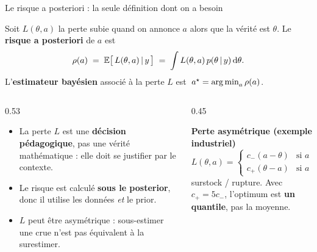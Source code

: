 \begin{frame}{Le risque a posteriori : la seule définition dont on a besoin}
\small
\vspace{-1mm}
\begin{kbox}
Soit $L(\theta, a)$ la perte subie quand on annonce $a$ alors que la vérité est $\theta$.
Le \textbf{risque a posteriori} de $a$ est
\[
\rho(a) \;=\; \mathbb{E}\big[\,L(\theta, a) \,\vert\, y \,\big]
\;=\; \int L(\theta, a)\, p(\theta \,\vert\, y)\,\mathrm{d}\theta .
\]
L'\textbf{estimateur bayésien} associé à la perte $L$ est
$\;a^\star = \operatorname*{arg\,min}_{a} \rho(a)$.
\end{kbox}
\vspace{1mm}
\begin{columns}[t]
\begin{column}{0.53\textwidth}
\begin{ebox}
\begin{itemize}
  \item La perte $L$ est une \textbf{décision pédagogique}, pas une vérité
        mathématique : elle doit se justifier par le contexte.
  \item Le risque est calculé \textbf{sous le posterior}, donc il utilise les
        données \emph{et} le prior.
  \item $L$ peut être asymétrique : sous-estimer une crue n'est pas équivalent à
        la surestimer.
\end{itemize}
\end{ebox}
\end{column}
\begin{column}{0.45\textwidth}
\begin{tcolorbox}[colback=byLight,colframe=byGrey!55,arc=2mm]
\small\textbf{Perte asymétrique (exemple industriel)}
\[
L(\theta, a)=
\begin{cases}
c_- (a-\theta) & \text{si } a > \theta \\
c_+ (\theta-a) & \text{si } a < \theta
\end{cases}
\]
surstock \;/\; rupture. Avec $c_+ = 5 c_-$, l'optimum est
\textbf{un quantile}, pas la moyenne.
\end{tcolorbox}
\end{column}
\end{columns}
\end{frame}

